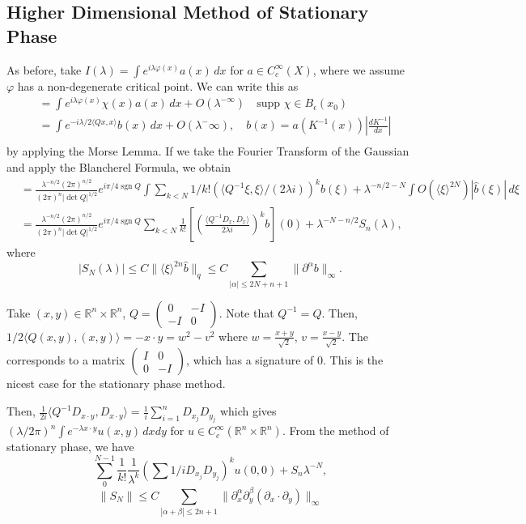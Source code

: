 \documentclass[12pt]{scrartcl}
\newcommand{\R}{\mathbb{R}}
\renewcommand{\hat}{\widehat}
\newcommand{\<}{\langle}
\renewcommand{\>}{\rangle}
\let \phi \varphi
\newcommand{\supp}{\text{supp }}
\begin{document}
\subsection{Higher Dimensional Method of Stationary Phase}
As before, take $I(\lambda) = \int e^{i \lambda \phi(x)}a(x)\,dx$ for $a \in C_c^\infty(X)$, where we assume $\phi$ has a non-degenerate critical point.  We can write this as 
\begin{align*}
&= \int e^{i \lambda \phi(x)} \chi(x)a(x)\,dx + O(\lambda^{-\infty}) \quad \supp \chi \in B_\epsilon(x_0) \\
&= \int e^{-i\lambda /2\<Qx, x\>}b(x)\,dx + O(\lambda^-\infty), \quad b(x) = a(K^{-1}(x))\left |\frac{dK^{-1}}{dx} \right| \\
\end{align*}
by applying the Morse Lemma.  If we take the Fourier Transform of the Gaussian and apply the Blancherel Formula, we obtain
\begin{align*}
&= \frac{\lambda^{-n/2}(2\pi)^{n/2}}{(2\pi)^n |\det Q|^{1/2}} e^{i\pi/4 \operatorname{sgn}{Q}} \int \sum_{k < N} 1/k! (\<Q^{-1}\xi, \xi\>/(2\lambda i))^k \hat{b}(\xi) + \lambda^{-n/2-N} \int O(\<\xi\>^{2N})|\hat{b}(\xi)|\,d\xi\\
&=  \frac{\lambda^{-n/2}(2\pi)^{n/2}}{(2\pi)^n |\det Q|^{1/2}} e^{i\pi/4 \operatorname{sgn}{Q}} \sum_{k < N} \frac{1}{k!} \left[\left (\frac{\<Q^{-1}D_x, D_x\>}{2\lambda i}\right )^k b\right](0) + \lambda^{-N - n/2} S_n(\lambda),
\end{align*}
where
$$|S_N(\lambda)| \le C \|\<\xi\>^{2n}\hat{b}\|_q \le C \sum_{|\alpha| \le 2N + n + 1} \| \partial^\alpha b\|_\infty.$$
\begin{example} Take $(x, y) \in \R^n \times \R^n$, $Q = \begin{pmatrix}
0 & -I \\
-I & 0 
\end{pmatrix}$.  Note that $Q^{-1} = Q$.  Then, $1/2 \<Q(x, y), (x, y)\> = -x \cdot y = w^2 - v^2$ where $w = \frac{x+y}{\sqrt{2}}$, $v = \frac{x-y}{\sqrt{2}}$.  The corresponds to a matrix $\begin{pmatrix}
I & 0 \\ 0 & -I
\end{pmatrix}$, which has a signature of $0$.  This is the nicest case for the stationary phase method.  

Then, $\frac{1}{2i} \<Q^{-1} D_{x\cdot y}, D_{x \cdot y}\> = \frac{1}{i} \sum_{i=1}^n D_{x_j}D_{y_j}$ which gives $(\lambda /2\pi)^n \int e^{-\lambda x \cdot y} u(x, y)\,dxdy$ for $u \in C_c^\infty(\R^n \times \R^n)$.  From the method of stationary phase, we have
$$\sum_{0}^{N-1} \frac{1}{k!} \frac{1}{\lambda^k} (\sum 1/i D_{x_j}D_{y_j})^k u(0, 0) + S_n \lambda^{-N},$$
$$\|S_N\| \le C \sum_{|\alpha + \beta| \le 2n+1} \|\partial_x^\alpha \partial_y^\beta (\partial_x \cdot \partial_y)\|_\infty$$
\end{example}
\end{document}
